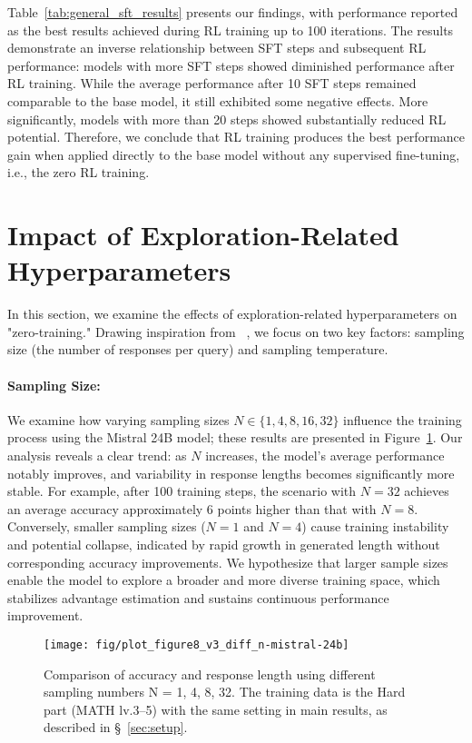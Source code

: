 Table~\ref{tab:general_sft_results} presents our findings, with performance reported as the best results achieved during RL training up to 100 iterations. The results demonstrate an inverse relationship between SFT steps and subsequent RL performance: models with more SFT steps showed diminished performance after RL training. While the average performance after 10 SFT steps remained comparable to the base model, it still exhibited some negative effects. More significantly, models with more than 20 steps showed substantially reduced RL potential.
Therefore, we conclude that RL training produces the best performance gain when applied directly to the base model without any supervised fine-tuning, i.e., the zero RL training.

\section{Impact of Exploration-Related Hyperparameters}
\label{sec:impact_explore_hyper}
In this section, we examine the effects of exploration-related hyperparameters on "zero-training." Drawing inspiration from ~\citet{zeng2024b,liu2024diving}, we focus on two key factors: sampling size (the number of responses per query) and sampling temperature.

\paragraph{Sampling Size:} We examine how varying sampling sizes $N \in \{1,4,8,16,32\}$ influence the training process using the Mistral 24B model; these results are presented in Figure~\ref{fig:sampling_number}. Our analysis reveals a clear trend: as $N$ increases, the model's average performance notably improves, and variability in response lengths becomes significantly more stable. For example, after 100 training steps, the scenario with $N=32$ achieves an average accuracy approximately 6 points higher than that with $N=8$. Conversely, smaller sampling sizes ($N=1$ and $N=4$) cause training instability and potential collapse, indicated by rapid growth in generated length without corresponding accuracy improvements. We hypothesize that larger sample sizes enable the model to explore a broader and more diverse training space, which stabilizes advantage estimation and sustains continuous performance improvement.

\begin{figure}[!t]
        \centering
\texttt{[image: fig/plot\_figure8\_v3\_diff\_n-mistral-24b]}
\caption{Comparison of accuracy and response length using different sampling numbers N = 1, 4, 8, 32. The training data is the Hard part (MATH lv.3–5) with the same setting in main results, as described in \S~\ref{sec:setup}.}
        \label{fig:sampling_number}
\end{figure}


